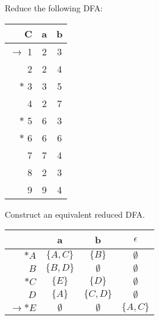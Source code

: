\documentclass[a4paper,12pt]{amsart}
\begin{document}
\medskip\begin{problem}    
    
    Reduce the following DFA:
    
    \begin{center}
        \begin{tabular}{ r | c c }
            C & a & b \\ \hline
            $\to$ 1 & 2 & 3 \\
            2 & 2 & 4 \\
            $\ast$ 3 & 3 & 5 \\
            4 & 2 & 7 \\
            $\ast$ 5 & 6 & 3 \\
            $\ast$ 6 & 6 & 6 \\
            7 & 7 & 4 \\
            8 & 2 & 3 \\
            9 & 9 & 4
        \end{tabular}
    \end{center}

\end{problem}


\medskip\begin{problem}

    Construct an equivalent reduced DFA.    
    
    \begin{center}
        \begin{tabular}{ r | c c c }
            & a & b & $\epsilon$ \\ \hline
            $\ast A$ & $\{A,C\}$ & $\{B\}$ & $\emptyset$ \\
            $B$ & $\{B,D\}$ & $\emptyset$ & $\emptyset$ \\
            $\ast C$ & $\{E\}$ & $\{D\}$ & $\emptyset$ \\
            $D$ & $\{A\}$ & $\{C,D\}$ & $\emptyset$ \\
            $\to\ast E$ & $\emptyset$ & $\emptyset$ & $\{A,C\}$
        \end{tabular}
    \end{center}

\end{problem}
\end{document}
